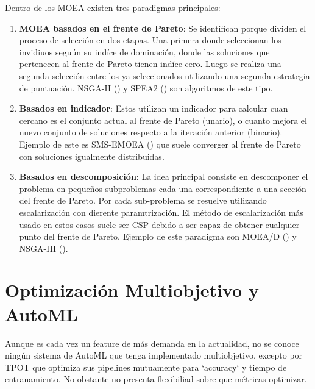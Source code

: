 Dentro de los MOEA existen tres paradigmas principales:
\begin{enumerate}
    \item \textbf{MOEA basados en el frente de Pareto}: Se identifican porque dividen el proceso de selecci\'on en dos etapas. Una primera donde seleccionan los invidiuos segu\'un su ind\'ice de dominaci\'on, donde las soluciones que pertenecen al frente de Pareto tienen ind\'ice cero. Luego se realiza una segunda selecci\'on entre los ya seleccionados utilizando una segunda estrategia de puntuaci\'on. NSGA-II (\cite{deb2002fast}) y SPEA2 (\cite{zitzler1999multiobjective}) son algoritmos de este tipo.

    \item \textbf{Basados en indicador}: Estos utilizan un indicador para calcular cuan cercano es el conjunto actual al frente de Pareto (unario), o cuanto mejora el nuevo conjunto de soluciones respecto a la iteraci\'on anterior (binario). Ejemplo de este es SMS-EMOEA (\cite{emmerich2005emo}) que suele converger al frente de Pareto con soluciones igualmente distribuidas.

    \item \textbf{Basados en descomposici\'on}: La idea principal consiste en descomponer el problema en pequeños subproblemas cada una correspondiente a una secci\'on del frente de Pareto. Por cada sub-problema se resuelve utilizando escalarizaci\'on con dierente paramtrizaci\'on. El m\'etodo de escalarizaci\'on m\'as usado en estos casos suele ser CSP debido a ser capaz de obtener cualquier punto del frente de Pareto. Ejemplo de este paradigma son MOEA/D (\cite{zhang2007moea}) y NSGA-III (\cite{deb2013evolutionary}).
\end{enumerate}


\section{Optimizaci\'on Multiobjetivo y AutoML}

Aunque es cada vez un feature de m\'as demanda en la actualidad, no se conoce ning\'un sistema de AutoML que tenga implementado multiobjetivo, excepto por TPOT que optimiza sus pipelines mutuamente para `accuracy` y tiempo de entranamiento. No obstante no presenta flexibiliad sobre que m\'etricas optimizar.\\


